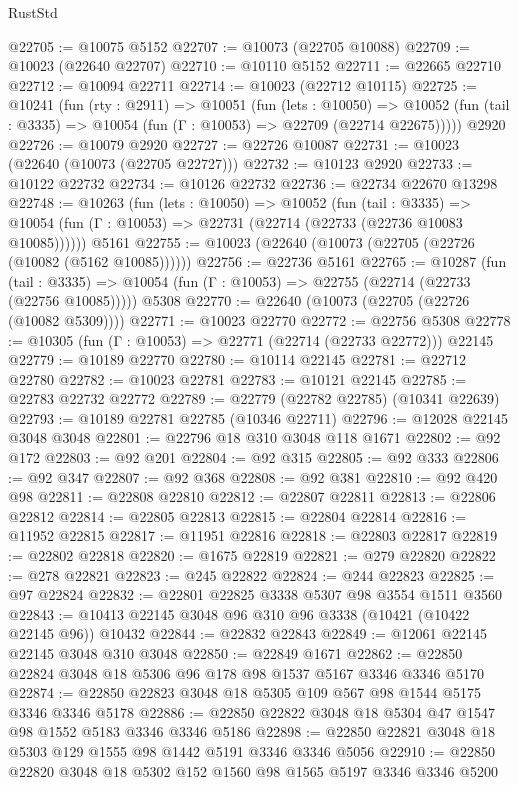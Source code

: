 \begin{lexlean}{RustStd}
\begin{coremodule}
@22705 := @10075 @5152
@22707 := @10073 (@22705 @10088)
@22709 := @10023 (@22640 @22707)
@22710 := @10110 @5152
@22711 := @22665 @22710
@22712 := @10094 @22711
@22714 := @10023 (@22712 @10115)
@22725 := @10241
    (fun (rty : @2911) =>
    @10051
      (fun (lets : @10050) =>
      @10052 (fun (tail : @3335) => @10054 (fun (Γ : @10053) => @22709 (@22714 @22675)))))
    @2920
@22726 := @10079 @2920
@22727 := @22726 @10087
@22731 := @10023 (@22640 (@10073 (@22705 @22727)))
@22732 := @10123 @2920
@22733 := @10122 @22732
@22734 := @10126 @22732
@22736 := @22734 @22670 @13298
@22748 := @10263
    (fun (lets : @10050) =>
    @10052
      (fun (tail : @3335) =>
      @10054 (fun (Γ : @10053) => @22731 (@22714 (@22733 (@22736 @10083 @10085))))))
    @5161
@22755 := @10023 (@22640 (@10073 (@22705 (@22726 (@10082 (@5162 @10085))))))
@22756 := @22736 @5161
@22765 := @10287
    (fun (tail : @3335) => @10054 (fun (Γ : @10053) => @22755 (@22714 (@22733 (@22756 @10085)))))
    @5308
@22770 := @22640 (@10073 (@22705 (@22726 (@10082 @5309))))
@22771 := @10023 @22770
@22772 := @22756 @5308
@22778 := @10305 (fun (Γ : @10053) => @22771 (@22714 (@22733 @22772))) @22145
@22779 := @10189 @22770
@22780 := @10114 @22145
@22781 := @22712 @22780
@22782 := @10023 @22781
@22783 := @10121 @22145
@22785 := @22783 @22732 @22772
@22789 := @22779 (@22782 @22785) (@10341 @22639)
@22793 := @10189 @22781 @22785 (@10346 @22711)
@22796 := @12028 @22145 @3048 @3048
@22801 := @22796 @18 @310 @3048 @118 @1671
@22802 := @92 @172
@22803 := @92 @201
@22804 := @92 @315
@22805 := @92 @333
@22806 := @92 @347
@22807 := @92 @368
@22808 := @92 @381
@22810 := @92 @420 @98
@22811 := @22808 @22810
@22812 := @22807 @22811
@22813 := @22806 @22812
@22814 := @22805 @22813
@22815 := @22804 @22814
@22816 := @11952 @22815
@22817 := @11951 @22816
@22818 := @22803 @22817
@22819 := @22802 @22818
@22820 := @1675 @22819
@22821 := @279 @22820
@22822 := @278 @22821
@22823 := @245 @22822
@22824 := @244 @22823
@22825 := @97 @22824
@22832 := @22801 @22825 @3338 @5307 @98 @3554 @1511 @3560
@22843 := @10413 @22145 @3048 @96 @310 @96 @3338 (@10421 (@10422 @22145 @96)) @10432
@22844 := @22832 @22843
@22849 := @12061 @22145 @22145 @3048 @310 @3048
@22850 := @22849 @1671
@22862 := @22850 @22824 @3048 @18 @5306 @96 @178 @98 @1537 @5167 @3346 @3346 @5170
@22874 := @22850 @22823 @3048 @18 @5305 @109 @567 @98 @1544 @5175 @3346 @3346 @5178
@22886 := @22850 @22822 @3048 @18 @5304 @47 @1547 @98 @1552 @5183 @3346 @3346 @5186
@22898 := @22850 @22821 @3048 @18 @5303 @129 @1555 @98 @1442 @5191 @3346 @3346 @5056
@22910 := @22850 @22820 @3048 @18 @5302 @152 @1560 @98 @1565 @5197 @3346 @3346 @5200

\end{coremodule}
\end{lexlean}
